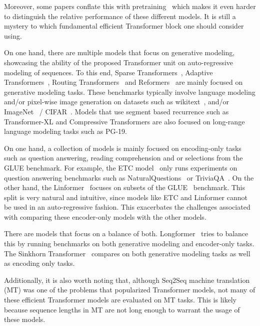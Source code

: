 Moreover, some papers conflate this with pretraining~\citep{devlin2018bert} which makes it even harder to distinguish the relative performance of these different models. It is still a mystery to which fundamental efficient Transformer block one should consider using.

On one hand, there are multiple models that focus on generative modeling, showcasing the ability of the proposed Transformer unit on auto-regressive modeling of sequences. To this end, Sparse Transformers~\citep{child2019generating}, Adaptive Transformers~\citep{correia2019adaptively}, Routing Transformers~\citep{roy2020efficient} and Reformers~\citep{kitaev2020reformer} are mainly focused on generative modeling tasks. These benchmarks typically involve language modeling and/or pixel-wise image generation on datasets such as wikitext~\citep{merity2016pointer}, and/or ImageNet~\citep{deng2009imagenet} / CIFAR~\citep{krizhevsky2009learning}. Models that use segment based recurrence such as Transformer-XL and Compressive Transformers are also focused on long-range language modeling tasks such as PG-19. 

On one hand, a collection of models is mainly focused on encoding-only tasks such as question answering, reading comprehension and or selections from the GLUE benchmark. For example, the ETC model~\citep{ainslie2020etc} only runs experiments on question answering benchmarks such as NaturalQuestions~\citep{47761} or TriviaQA~\citep{JoshiTriviaQA2017}. On the other hand, the Linformer~\citep{wang2020linformer} focuses on subsets of the GLUE~\citep{wang-etal-2018-glue} benchmark. This split is very natural and intuitive, since models like ETC and Linformer cannot be used in an auto-regressive fashion. This exacerbates the challenges associated with comparing these encoder-only models with the other models.

There are models that focus on a balance of both. Longformer~\citep{beltagy2020longformer} tries to balance this by running benchmarks on both generative modeling and encoder-only tasks. The Sinkhorn Transformer~\citep{tay2020sparse} compares on both generative modeling tasks as well as encoding only tasks. 

Additionally, it is also worth noting that, although Seq2Seq machine translation (MT) was one of the problems that popularized Transformer models, not many of these efficient Transformer models are evaluated on MT tasks. This is likely because sequence lengths in MT are not long enough to warrant the usage of these models. 

